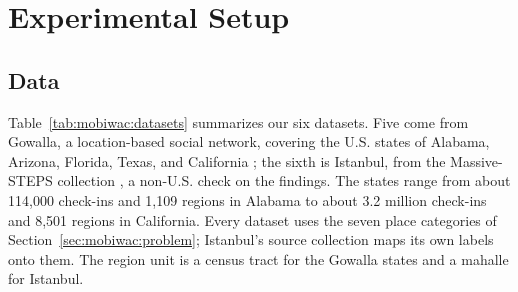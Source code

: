 \section{Experimental Setup}
\label{sec:mobiwac:setup}

\subsection{Data}
\label{sec:mobiwac:setup-data}
Table~\ref{tab:mobiwac:datasets} summarizes our six datasets. Five come from Gowalla, a location-based social network, covering the U.S. states of Alabama, Arizona, Florida, Texas, and California
\cite{cho2011gowalla}; the sixth is Istanbul, from the Massive-STEPS collection
\cite{wongso2025massivesteps}, a non-U.S. check on the findings.
The states range from about 114,000 check-ins and 1,109 regions in Alabama to about 3.2 million check-ins and 8,501 regions in California. Every dataset uses the seven place categories of Section~\ref{sec:mobiwac:problem}; Istanbul's source collection maps its own labels onto them. The region unit is a census tract for the Gowalla states and a mahalle for Istanbul.



